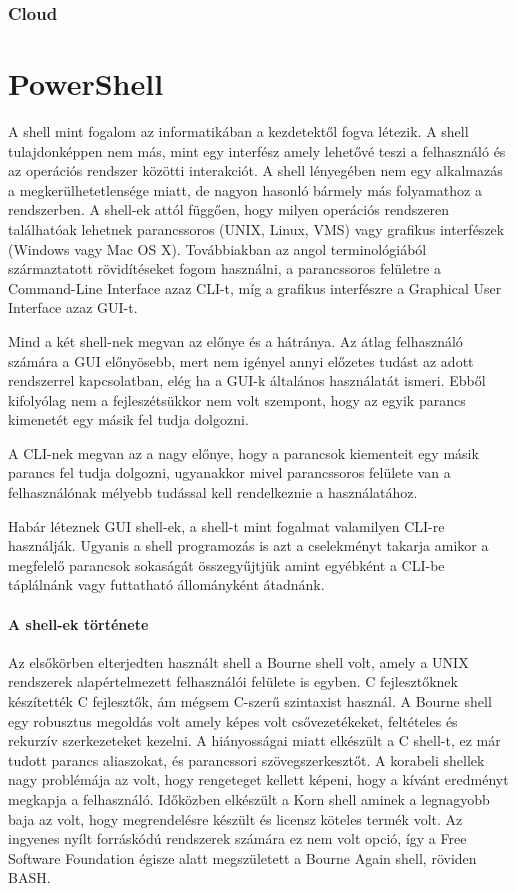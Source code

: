 \documentclass[12pt,oneside,justify,table]{book}
\begin{document}
\subsection{Cloud}
\noindent

\chapter{PowerShell}
A shell mint fogalom az informatikában a kezdetektől fogva létezik. A shell tulajdonképpen nem más, mint egy interfész amely lehetővé teszi a felhasználó és az operációs rendszer közötti interakciót. A shell lényegében nem egy alkalmazás a megkerülhetetlensége miatt, de nagyon hasonló bármely más folyamathoz a rendszerben. A shell-ek attól függően, hogy milyen operációs rendszeren találhatóak lehetnek parancssoros (UNIX, Linux, VMS) vagy grafikus interfészek (Windows vagy Mac OS X). Továbbiakban az angol terminológiából származtatott rövidítéseket fogom használni, a parancssoros felületre a Command-Line Interface azaz CLI-t, míg a grafikus interfészre a Graphical User Interface azaz GUI-t.

Mind a két shell-nek megvan az előnye és a hátránya. Az átlag felhasználó számára a GUI előnyösebb, mert nem igényel annyi előzetes tudást az adott rendszerrel kapcsolatban, elég ha a GUI-k általános használatát ismeri. Ebből kifolyólag nem a fejleszétsükkor nem volt szempont, hogy az egyik parancs kimenetét egy másik fel tudja dolgozni. 

A CLI-nek megvan az a nagy előnye, hogy a parancsok kiementeit egy másik parancs fel tudja dolgozni, ugyanakkor mivel parancssoros felülete van a felhasználónak mélyebb tudással kell rendelkeznie a használatához.

Habár léteznek GUI shell-ek, a shell-t mint fogalmat valamilyen CLI-re használják. Ugyanis a shell programozás is azt a cselekményt takarja amikor a megfelelő parancsok sokaságát összegyűjtjük amint egyébként a CLI-be táplálnánk vagy futtatható állományként átadnánk.
\cite{WindowsPowerShellUnleashed}

\subsubsection{A shell-ek története}
Az elsőkörben elterjedten használt shell a Bourne shell volt, amely a UNIX rendszerek alapértelmezett felhasználói felülete is egyben. C fejlesztőknek készítették C fejlesztők, ám mégsem C-szerű szintaxist használ. A Bourne shell egy robusztus megoldás volt amely képes volt csővezetékeket, feltételes és rekurzív szerkezeteket kezelni. A hiányosságai miatt elkészült a C shell-t, ez már tudott parancs aliaszokat, és parancssori szövegszerkesztőt. A korabeli shellek nagy problémája az volt, hogy rengeteget kellett képeni, hogy a kívánt eredményt megkapja a felhasználó. 
Időközben elkészült a Korn shell aminek a legnagyobb baja az volt, hogy megrendelésre készült és licensz köteles termék volt. Az ingyenes nyílt forráskódú rendszerek számára ez nem volt opció, így a Free Software Foundation égisze alatt megszületett a Bourne Again shell, röviden BASH.
\end{document}
